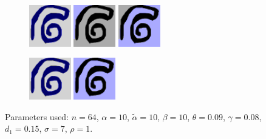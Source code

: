 \documentclass[12pt]{article}%
\begin{document}
\begin{figure}[ht]

\begin{subfigure}[b]{\textwidth}
\centering
\includegraphics[width=0.2\textwidth,height=0.2\textwidth]{spiral_bad_seg_1.png} \hspace{.45cm}
\includegraphics[width=0.2\textwidth,height=0.2\textwidth]{spiral_bad_seg_2.png} \hspace{.45cm}
\includegraphics[width=0.2\textwidth,height=0.2\textwidth]{spiral_bad_seg_3.png}
\end{subfigure}

\vspace{.45cm}

\begin{subfigure}[b]{\textwidth}
\centering
\includegraphics[width=0.2\textwidth,height=0.2\textwidth]{spiral_good_seg_1.png} \hspace{.45cm}
\includegraphics[width=0.2\textwidth,height=0.2\textwidth]{spiral_good_seg_2.png}
\end{subfigure}

\caption{Parameters used: $n = 64$, $\alpha = 10$, $\tilde{\alpha} = 10$, $\beta = 10$, $\theta = 0.09$, $\gamma = 0.08$, $d_1 = 0.15$, $\sigma = 7$, $\rho = 1$.}
\label{fig:spiral}

\end{figure}
\end{document}
